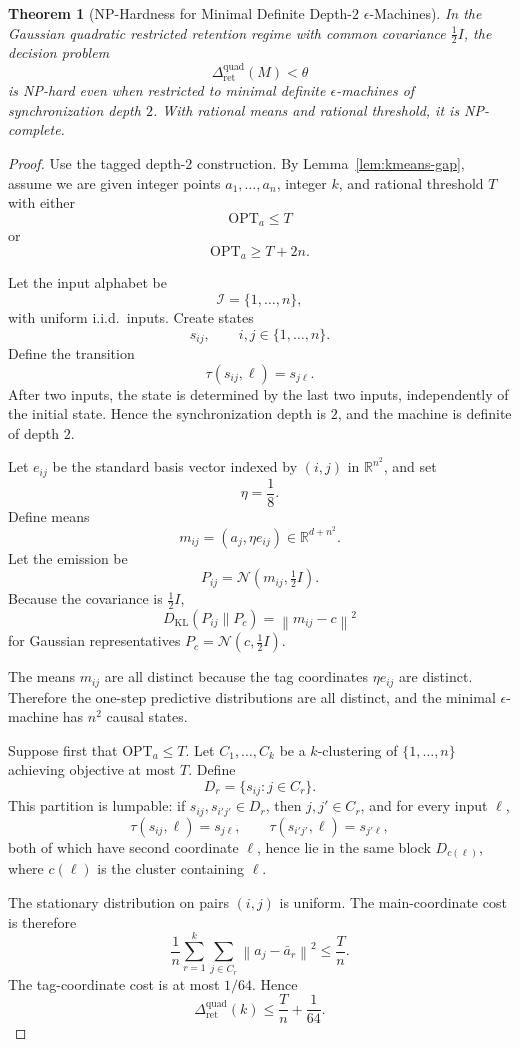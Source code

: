 \documentclass[12pt]{article}
\newtheorem{theorem}{Theorem}[section]
\theoremstyle{definition}
\newcommand{\norm}[1]{\left\lVert#1\right\rVert}
\newcommand{\RetQuad}{\Delta_{\mathrm{ret}}^{\mathrm{quad}}}
\begin{document}
\begin{theorem}[NP-Hardness for Minimal Definite Depth-$2$ $\epsilon$-Machines]
\label{thm:retention-definite-np}
In the Gaussian quadratic restricted retention regime with common covariance
$\frac12 I$, the decision problem
\[
\RetQuad(M)<\theta
\]
is NP-hard even when restricted to minimal definite $\epsilon$-machines of
synchronization depth $2$.  With rational means and rational threshold, it is
NP-complete.
\end{theorem}

\begin{proof}
Use the tagged depth-$2$ construction.  By Lemma~\ref{lem:kmeans-gap}, assume
we are given integer points $a_1,\dots,a_n$, integer $k$, and rational
threshold $T$ with either
\[
\mathrm{OPT}_a\le T
\]
or
\[
\mathrm{OPT}_a\ge T+2n.
\]

Let the input alphabet be
\[
\mathcal I=\{1,\dots,n\},
\]
with uniform i.i.d.\ inputs.  Create states
\[
s_{ij},
\qquad
i,j\in\{1,\dots,n\}.
\]
Define the transition
\[
\tau(s_{ij},\ell)=s_{j\ell}.
\]
After two inputs, the state is determined by the last two inputs, independently
of the initial state.  Hence the synchronization depth is $2$, and the machine
is definite of depth $2$.

Let $e_{ij}$ be the standard basis vector indexed by $(i,j)$ in
$\mathbb R^{n^2}$, and set
\[
\eta=\frac18.
\]
Define means
\[
m_{ij}=(a_j,\eta e_{ij})
\in
\mathbb R^{d+n^2}.
\]
Let the emission be
\[
P_{ij}=\mathcal N(m_{ij},\tfrac12 I).
\]
Because the covariance is $\frac12 I$,
\[
D_{\mathrm{KL}}(P_{ij}\|P_c)
=
\norm{m_{ij}-c}^2
\]
for Gaussian representatives $P_c=\mathcal N(c,\frac12 I)$.

The means $m_{ij}$ are all distinct because the tag coordinates
$\eta e_{ij}$ are distinct.  Therefore the one-step predictive distributions
are all distinct, and the minimal $\epsilon$-machine has $n^2$ causal states.

Suppose first that $\mathrm{OPT}_a\le T$.  Let $C_1,\dots,C_k$ be a
$k$-clustering of $\{1,\dots,n\}$ achieving objective at most $T$.  Define
\[
D_r=\{s_{ij}:j\in C_r\}.
\]
This partition is lumpable: if $s_{ij},s_{i'j'}\in D_r$, then
$j,j'\in C_r$, and for every input $\ell$,
\[
\tau(s_{ij},\ell)=s_{j\ell},
\qquad
\tau(s_{i'j'},\ell)=s_{j'\ell},
\]
both of which have second coordinate $\ell$, hence lie in the same block
$D_{c(\ell)}$, where $c(\ell)$ is the cluster containing $\ell$.

The stationary distribution on pairs $(i,j)$ is uniform.  The main-coordinate
cost is therefore
\[
\frac1n
\sum_{r=1}^k
\sum_{j\in C_r}
\norm{a_j-\bar a_r}^2
\le
\frac{T}{n}.
\]
The tag-coordinate cost is at most $1/64$.  Hence
\[
\RetQuad(k)
\le
\frac{T}{n}+\frac1{64}.
\]


\end{proof}
\end{document}
